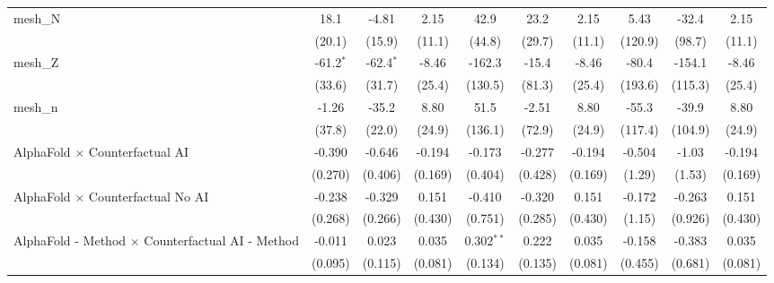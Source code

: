\begin{tabular}{lccccccccc}
   mesh\_N                                                     & 18.1          & -4.81         & 2.15          & 42.9           & 23.2          & 2.15          & 5.43    & -32.4     & 2.15\\   
                                                               & (20.1)        & (15.9)        & (11.1)        & (44.8)         & (29.7)        & (11.1)        & (120.9) & (98.7)    & (11.1)\\   
   mesh\_Z                                                     & -61.2$^{*}$   & -62.4$^{*}$   & -8.46         & -162.3         & -15.4         & -8.46         & -80.4   & -154.1    & -8.46\\   
                                                               & (33.6)        & (31.7)        & (25.4)        & (130.5)        & (81.3)        & (25.4)        & (193.6) & (115.3)   & (25.4)\\   
   mesh\_n                                                     & -1.26         & -35.2         & 8.80          & 51.5           & -2.51         & 8.80          & -55.3   & -39.9     & 8.80\\   
                                                               & (37.8)        & (22.0)        & (24.9)        & (136.1)        & (72.9)        & (24.9)        & (117.4) & (104.9)   & (24.9)\\   
   AlphaFold $\times$ Counterfactual AI                        & -0.390        & -0.646        & -0.194        & -0.173         & -0.277        & -0.194        & -0.504  & -1.03     & -0.194\\   
                                                               & (0.270)       & (0.406)       & (0.169)       & (0.404)        & (0.428)       & (0.169)       & (1.29)  & (1.53)    & (0.169)\\   
   AlphaFold $\times$ Counterfactual No AI                     & -0.238        & -0.329        & 0.151         & -0.410         & -0.320        & 0.151         & -0.172  & -0.263    & 0.151\\   
                                                               & (0.268)       & (0.266)       & (0.430)       & (0.751)        & (0.285)       & (0.430)       & (1.15)  & (0.926)   & (0.430)\\   
   AlphaFold - Method $\times$ Counterfactual AI - Method      & -0.011        & 0.023         & 0.035         & 0.302$^{**}$   & 0.222         & 0.035         & -0.158  & -0.383    & 0.035\\   
                                                               & (0.095)       & (0.115)       & (0.081)       & (0.134)        & (0.135)       & (0.081)       & (0.455) & (0.681)   & (0.081)\\   

\end{tabular}

